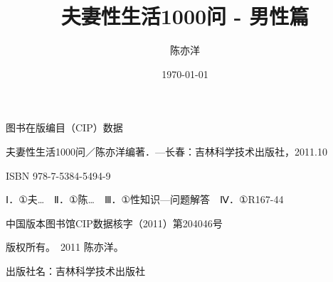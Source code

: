\begin{enumerate}
\usepackage{array}
\usepackage{longtable}
\usepackage{booktabs}
\usepackage{multirow}
\usepackage{makecell}

\usepackage{amsmath}
\usepackage{amssymb}
\usepackage{mathtools}

\usepackage{hyperref}
\usepackage{bookmark}

\usepackage{fancyhdr}
\pagestyle{fancy}
\fancyhf{}
\fancyhead[LE,RO]{\thepage}
\fancyhead[LO]{\song\leftmark}
\fancyhead[RE]{\song\rightmark}
\renewcommand{\headrulewidth}{0.4pt}
\renewcommand{\footrulewidth}{0pt}

\usepackage{wasysym}

\usepackage{datetime}

\usepackage{calc}
\usepackage{ifthen}
\usepackage{afterpage}
\usepackage{pdfpages}

\title{\hei{} 夫妻性生活1000问 - 男性篇}
\author{陈亦洋}
\date{\today}



\maketitle

\newpage
\thispagestyle{empty}
\begin{center}
    \vspace*{8cm}
    \song{} 图书在版编目（CIP）数据\par
    \vspace{0.5em}
    \song{} 夫妻性生活1000问／陈亦洋编著．—长春：吉林科学技术出版社，2011.10\par
    \vspace{0.5em}
    \song{} ISBN 978-7-5384-5494-9\par
    \vspace{0.5em}
    \song{} Ⅰ．①夫…　Ⅱ．①陈…　Ⅲ．①性知识—问题解答　Ⅳ．①R167-44\par
    \vspace{0.5em}
    \song{} 中国版本图书馆CIP数据核字（2011）第204046号\par
    \vspace{2em}
    \song{} 版权所有。\textcopyright\ 2011 陈亦洋。\par
    \vspace{0.5em}
    \song{} 出版社名：吉林科学技术出版社\par
\end{center}


\end{enumerate}
